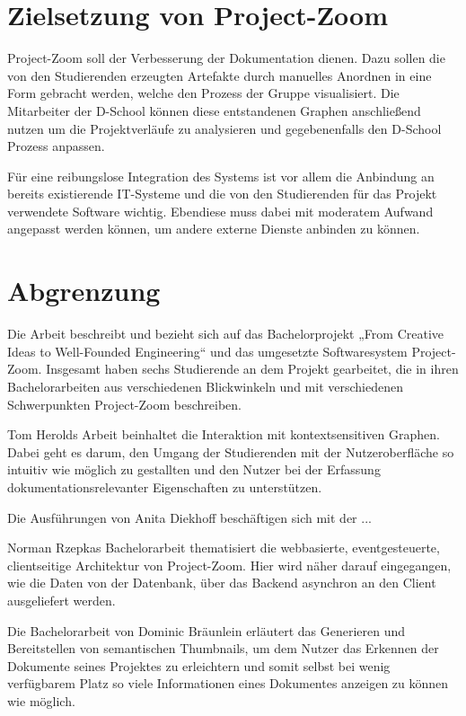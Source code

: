 \section{Zielsetzung von Project-Zoom}
Project-Zoom soll der Verbesserung der Dokumentation dienen. Dazu sollen die von den Studierenden erzeugten Artefakte durch manuelles Anordnen in eine Form gebracht werden, welche den Prozess der Gruppe visualisiert. Die Mitarbeiter der D-School können diese entstandenen Graphen anschließend nutzen um die Projektverläufe zu analysieren und gegebenenfalls den D-School Prozess anpassen.

Für eine reibungslose Integration des Systems ist vor allem die Anbindung an bereits existierende IT-Systeme und die von den Studierenden für das Projekt verwendete Software wichtig. Ebendiese muss dabei mit moderatem Aufwand angepasst werden können, um andere externe Dienste anbinden zu können.

\section{Abgrenzung}
Die Arbeit beschreibt und bezieht sich auf das Bachelorprojekt „From Creative Ideas to Well-Founded Engineering“ und das umgesetzte Softwaresystem Project-Zoom. Insgesamt haben sechs Studierende an dem Projekt gearbeitet, die in ihren Bachelorarbeiten aus verschiedenen Blickwinkeln und mit verschiedenen Schwerpunkten Project-Zoom beschreiben.

Tom Herolds Arbeit \cite{bp-tomh} beinhaltet die Interaktion mit kontextsensitiven Graphen. Dabei geht es darum, den Umgang der Studierenden mit der Nutzeroberfläche so intuitiv wie möglich zu gestallten und den Nutzer bei der Erfassung dokumentationsrelevanter Eigenschaften zu unterstützen.

Die Ausführungen von Anita Diekhoff \cite{bp-anita}  beschäftigen sich mit der ...

Norman Rzepkas Bachelorarbeit \cite{bp-norman} thematisiert die webbasierte, eventgesteuerte, clientseitige Architektur von Project-Zoom. Hier wird näher darauf eingegangen, wie die Daten von der Datenbank, über das Backend asynchron an den Client ausgeliefert werden.

Die Bachelorarbeit von Dominic Bräunlein \cite{bp-dome} erläutert das Generieren und Bereitstellen von semantischen \gls{Thumbnails}, um dem Nutzer das Erkennen der Dokumente seines Projektes zu erleichtern und somit selbst bei wenig verfügbarem Platz so viele Informationen eines Dokumentes anzeigen zu können wie möglich. 

